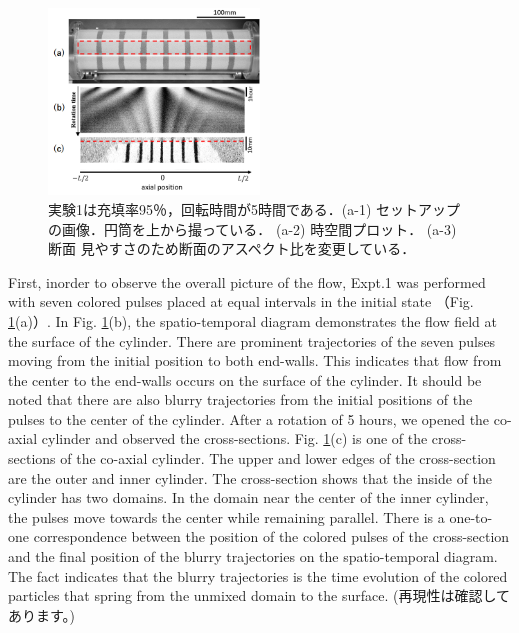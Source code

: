 \documentclass[prl,twocolumn,superscriptaddress]{revtex4}
\begin{document}
\begin{figure}[tb]
	\centering
	\includegraphics[width=0.5\textwidth]{figure/24_gray.png}
	\caption{実験1は充填率95％，回転時間が5時間である．(a-1) セットアップの画像．円筒を上から撮っている． (a-2) 時空間プロット． (a-3) 断面 見やすさのため断面のアスペクト比を変更している．}
	\label{fig:Expt.1}
\end{figure}

First,  inorder to observe the overall picture of the flow,
Expt.1 was performed with seven colored pulses placed at equal intervals in the initial state （Fig. \ref{fig:Expt.1}(a)）. 
In Fig. \ref{fig:Expt.1}(b), the spatio-temporal diagram demonstrates the flow field at the surface of the cylinder. There are prominent trajectories of the seven pulses moving from the initial position to both end-walls. This indicates that flow from the center to the end-walls occurs on the surface of the cylinder.
It should be noted that there are also blurry trajectories from the initial positions of the pulses
to the center of the cylinder.
After a rotation of 5 hours, we opened the co-axial cylinder and observed the cross-sections.
Fig. \ref{fig:Expt.1}(c) is one of the cross-sections of the co-axial cylinder.
The upper and lower edges of the cross-section are the outer and inner cylinder.
The cross-section shows that the inside of the cylinder has two domains.
In the domain near the center of the inner cylinder, %
the pulses move towards the center while remaining parallel.
There is a one-to-one correspondence between the position of the colored pulses of the cross-section and the final position of the blurry trajectories on the spatio-temporal diagram. The fact indicates that the blurry trajectories is the time evolution of the colored particles that spring from the unmixed domain to the surface. 
(再現性は確認してあります。)
\end{document}
